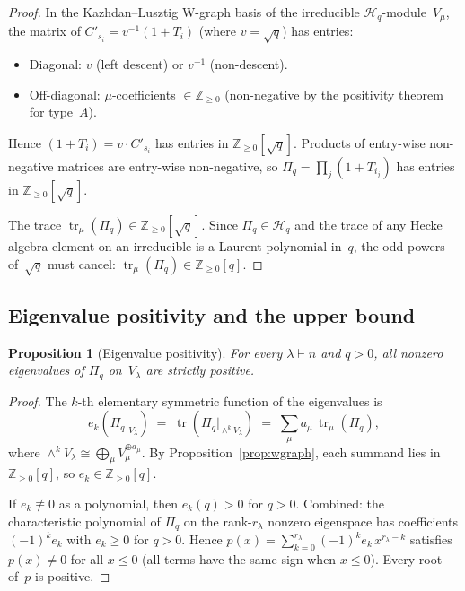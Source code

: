 \documentclass[11pt]{article}
\newtheorem{proposition}[theorem]{Proposition}
\theoremstyle{definition}
\theoremstyle{remark}
\DeclareMathOperator{\tr}{tr}
\begin{document}
\begin{proof}
In the Kazhdan--Lusztig W-graph basis of the irreducible
$\mathcal{H}_q$-module~$V_\mu$, the matrix of
$C'_{s_i} = v^{-1}(1+T_i)$ (where $v = \sqrt{q}$) has entries:
\begin{itemize}
\item Diagonal: $v$ (left descent) or $v^{-1}$ (non-descent).
\item Off-diagonal: $\mu$-coefficients $\in \mathbb{Z}_{\ge 0}$
  (non-negative by the positivity theorem for type~$A$).
\end{itemize}
Hence $(1+T_i) = v \cdot C'_{s_i}$ has entries in
$\mathbb{Z}_{\ge 0}[\sqrt{q}]$. Products of entry-wise non-negative
matrices are entry-wise non-negative, so
$\Pi_q = \prod_j (1+T_{i_j})$ has entries in
$\mathbb{Z}_{\ge 0}[\sqrt{q}]$.

The trace $\tr_\mu(\Pi_q) \in \mathbb{Z}_{\ge 0}[\sqrt{q}]$. Since
$\Pi_q \in \mathcal{H}_q$ and the trace of any Hecke algebra element
on an irreducible is a Laurent polynomial in~$q$, the odd powers
of~$\sqrt{q}$ must cancel: $\tr_\mu(\Pi_q) \in \mathbb{Z}_{\ge 0}[q]$.
\end{proof}

\subsection{Eigenvalue positivity and the upper bound}

\begin{proposition}[Eigenvalue positivity]\label{prop:eigpos}
For every $\lambda \vdash n$ and $q > 0$, all nonzero eigenvalues of
$\Pi_q$ on~$V_\lambda$ are strictly positive.
\end{proposition}

\begin{proof}
The $k$-th elementary symmetric function of the eigenvalues is
\[
  e_k(\Pi_q|_{V_\lambda})
  \;=\; \tr(\Pi_q|_{\wedge^k V_\lambda})
  \;=\; \sum_\mu a_\mu\,\tr_\mu(\Pi_q),
\]
where $\wedge^k V_\lambda \cong \bigoplus_\mu V_\mu^{\oplus a_\mu}$.
By Proposition~\ref{prop:wgraph}, each summand lies in
$\mathbb{Z}_{\ge 0}[q]$, so $e_k \in \mathbb{Z}_{\ge 0}[q]$.

If $e_k \not\equiv 0$ as a polynomial, then $e_k(q) > 0$ for
$q > 0$. Combined: the characteristic polynomial of $\Pi_q$ on the
rank-$r_\lambda$ nonzero eigenspace has coefficients $(-1)^k e_k$
with $e_k \ge 0$ for $q > 0$. Hence
$p(x) = \sum_{k=0}^{r_\lambda} (-1)^k e_k\, x^{r_\lambda - k}$
satisfies $p(x) \ne 0$ for all $x \le 0$ (all terms have the same
sign when $x \le 0$). Every root of~$p$ is positive.
\end{proof}
\end{document}
